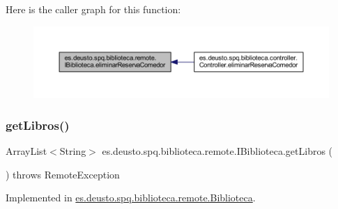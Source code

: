 Here is the caller graph for this function\+:
\nopagebreak
\begin{figure}[H]
\begin{center}
\leavevmode
\includegraphics[width=350pt]{interfacees_1_1deusto_1_1spq_1_1biblioteca_1_1remote_1_1_i_biblioteca_a36db52ba728865b02b2f25024d942149_icgraph}
\end{center}
\end{figure}
\mbox{\label{interfacees_1_1deusto_1_1spq_1_1biblioteca_1_1remote_1_1_i_biblioteca_a84e7d607d76ccc999d384d967987ebd8}} 
\subsubsection{\texorpdfstring{get\+Libros()}{getLibros()}}
{\footnotesize\ttfamily Array\+List$<$String$>$ es.\+deusto.\+spq.\+biblioteca.\+remote.\+I\+Biblioteca.\+get\+Libros (\begin{DoxyParamCaption}{ }\end{DoxyParamCaption}) throws Remote\+Exception}



Implemented in \mbox{\hyperlink{classes_1_1deusto_1_1spq_1_1biblioteca_1_1remote_1_1_biblioteca_a9af87498dad047e3b371f17b3d29bcff}{es.\+deusto.\+spq.\+biblioteca.\+remote.\+Biblioteca}}.

